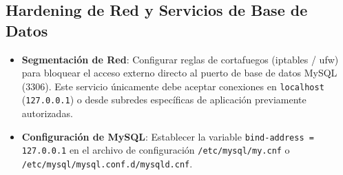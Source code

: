 \documentclass[11pt,a4paper]{article}
\begin{document}
\subsection{Hardening de Red y Servicios de Base de Datos}
\begin{itemize}
    \item \textbf{Segmentación de Red}: Configurar reglas de cortafuegos (iptables / ufw) para bloquear el acceso externo directo al puerto de base de datos MySQL (3306). Este servicio únicamente debe aceptar conexiones en \texttt{localhost} (\texttt{127.0.0.1}) o desde subredes específicas de aplicación previamente autorizadas.
    \item \textbf{Configuración de MySQL}: Establecer la variable \texttt{bind-address = 127.0.0.1} en el archivo de configuración \texttt{/etc/mysql/my.cnf} o \texttt{/etc/mysql/mysql.conf.d/mysqld.cnf}.
\end{itemize}
\end{document}

